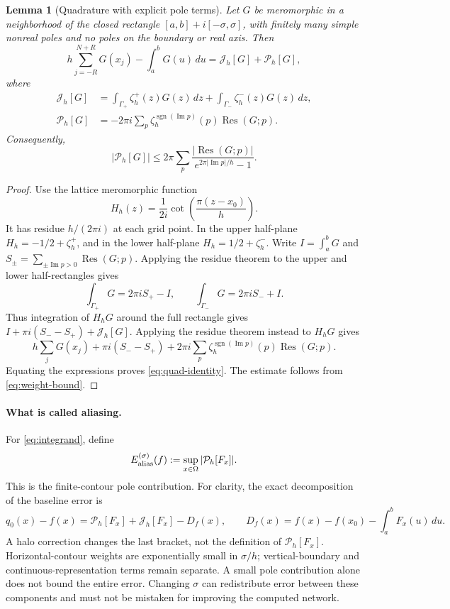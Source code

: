 \documentclass[11pt]{article}
\newtheorem{lemma}[theorem]{Lemma}
\theoremstyle{definition}\newtheorem{definition}[theorem]{Definition}
\theoremstyle{remark}\newtheorem{remark}[theorem]{Remark}
\numberwithin{equation}{section}
\DeclareMathOperator{\Res}{Res}
\newcommand{\Perr}{\mathcal P_h}
\newcommand{\Jerr}{\mathcal J_h}
\begin{document}
\begin{lemma}[Quadrature with explicit pole terms]
\label{lem:quadrature}
Let $G$ be meromorphic in a neighborhood of the closed rectangle $[a,b]+i[-\sigma,\sigma]$, with finitely many simple nonreal poles and no poles on the boundary or real axis. Then
\begin{equation}
 h\sum_{j=-R}^{N+R}G(x_j)-\int_a^bG(u)\,du
 =\Jerr[G]+\Perr[G],
 \label{eq:quad-identity}
\end{equation}
where
\begin{align}
 \Jerr[G]&=\int_{\Gamma_+}\zeta_h^+(z)G(z)\,dz
          +\int_{\Gamma_-}\zeta_h^-(z)G(z)\,dz,\label{eq:J}\\
 \Perr[G]&=-2\pi i\sum_p\zeta_h^{\operatorname{sgn}(\operatorname{Im}p)}(p)
                    \Res(G;p).\label{eq:P}
\end{align}
Consequently,
\begin{equation}
 |\Perr[G]|\le2\pi\sum_p
 \frac{|\Res(G;p)|}{e^{2\pi|\operatorname{Im}p|/h}-1}.
 \label{eq:residue-bound}
\end{equation}
\end{lemma}
\begin{proof}
Use the lattice meromorphic function
\[
 H_h(z)=\frac1{2i}\cot\!\left(\frac{\pi(z-x_0)}h\right).
\]
It has residue $h/(2\pi i)$ at each grid point. In the upper half-plane $H_h=-1/2+\zeta_h^+$, and in the lower half-plane $H_h=1/2+\zeta_h^-$. Write $I=\int_a^bG$ and $S_\pm=\sum_{\pm\operatorname{Im}p>0}\Res(G;p)$. Applying the residue theorem to the upper and lower half-rectangles gives
\[
 \int_{\Gamma_+}G=2\pi iS_+-I,\qquad
 \int_{\Gamma_-}G=2\pi iS_-+I.
\]
Thus integration of $H_hG$ around the full rectangle gives
$I+\pi i(S_--S_+)+\Jerr[G]$.
Applying the residue theorem instead to $H_hG$ gives
\[
 h\sum_jG(x_j)+\pi i(S_--S_+)
 +2\pi i\sum_p\zeta_h^{\operatorname{sgn}(\operatorname{Im}p)}(p)\Res(G;p).
\]
Equating the expressions proves \eqref{eq:quad-identity}. The estimate follows from \eqref{eq:weight-bound}.
\end{proof}

\paragraph{What is called aliasing.}
For \eqref{eq:integrand}, define
\begin{equation}
 E_{\rm alias}^{(\sigma)}(f):=
 \sup_{x\in\Omega}|\Perr[F_x]|.
 \label{eq:alias-definition}
\end{equation}
This is the finite-contour pole contribution. For clarity, the exact decomposition of the baseline error is
\begin{equation}
 q_0(x)-f(x)
 =\Perr[F_x]+\Jerr[F_x]-D_f(x),\qquad
 D_f(x)=f(x)-f(x_0)-\int_a^bF_x(u)\,du.
 \label{eq:full-decomposition}
\end{equation}
A halo correction changes the last bracket, not the definition of $\Perr[F_x]$. Horizontal-contour weights are exponentially small in $\sigma/h$; vertical-boundary and continuous-representation terms remain separate. A small pole contribution alone does not bound the entire error. Changing $\sigma$ can redistribute error between these components and must not be mistaken for improving the computed network.
\end{document}
